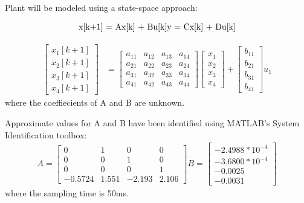Plant will be modeled using a state-space approach:

\begin{subequations}
    $x[k+1] = Ax[k] + Bu[k]$ \\
    $y = Cx[k] + Du[k]$
\end{subequations}

\begin{align*}
\begin{bmatrix}
    x_1[k+1] \\
    x_2[k+1] \\
    x_3[k+1] \\
    x_4[k+1]
\end{bmatrix}&=
\begin{bmatrix}
  a_{11} &  a_{12}&  a_{13}&  a_{14}\\
  a_{21} &  a_{22}&  a_{23}&  a_{24}\\  
  a_{31} &  a_{32}&  a_{33}&  a_{34}\\  
  a_{41} &  a_{42}&  a_{43}&  a_{44}
\end{bmatrix} 
\begin{bmatrix}
     x_1 \\
     x_2\\
     x_3\\
     x_4
\end{bmatrix}
+
\begin{bmatrix}
    b_{11}\\
    b_{21}\\
    b_{31}\\
    b_{41}
\end{bmatrix}
u_1 
\end{align*}
where the coeffiecients of A and B are unknown.

Approximate values for A and B have been identified using MATLAB's System Identification toolbox:
%
\begin{align*}
A=
\begin{bmatrix}
  0 &  1 & 0 & 0\\
  0 &  0 & 1 & 0\\  
  0 &  0 & 0 & 1\\  
  -0.5724 & 1.551 & -2.193 & 2.106
\end{bmatrix} 
B=
\begin{bmatrix}
    -2.4988*10^{-4}\\
    -3.6800*10^{-4}\\
    -0.0025\\
    -0.0031
\end{bmatrix} 
\end{align*}
%
where the sampling time is 50ms.

